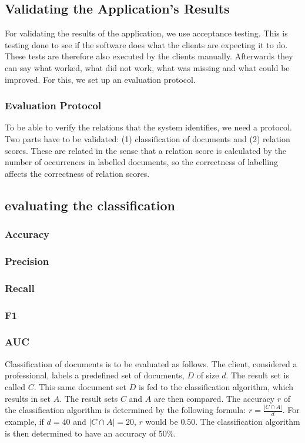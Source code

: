 \subsection{Validating the Application's Results}
For validating the results of the application, we use acceptance testing. This is testing done to see if the software does what the clients are expecting it to do. These tests are therefore also executed by the clients manually. Afterwards they can say what worked, what did not work, what was missing and what could be improved. For this, we set up an evaluation protocol.\\

\subsubsection{Evaluation Protocol}\label{sec:validation_protocol}
To be able to verify the relations that the system identifies, we need a protocol. Two parts have to be validated: (1) classification of documents and (2) relation scores. These are related in the sense that a relation score is calculated by the number of occurrences in labelled documents, so the correctness of labelling affects the correctness of relation scores.\\

\subsection{evaluating the classification}
\subsubsection{Accuracy}
\subsubsection{Precision}
\subsubsection{Recall}
\subsubsection{F1}
\subsubsection{AUC}
Classification of documents is to be evaluated as follows. The client, considered a professional, labels a predefined set of documents, $D$ of size $d$. The result set is called $C$. This same document set $D$ is fed to the classification algorithm, which results in set $A$. The result sets $C$ and $A$ are then compared. The accuracy $r$ of the classification algorithm is determined by the following formula: $r = \frac{|C \cap A|}{d}$. For example, if $d=40$ and $|C \cap A|=20$, $r$ would be $0.50$. The classification algorithm is then determined to have an accuracy of 50\%.\\

